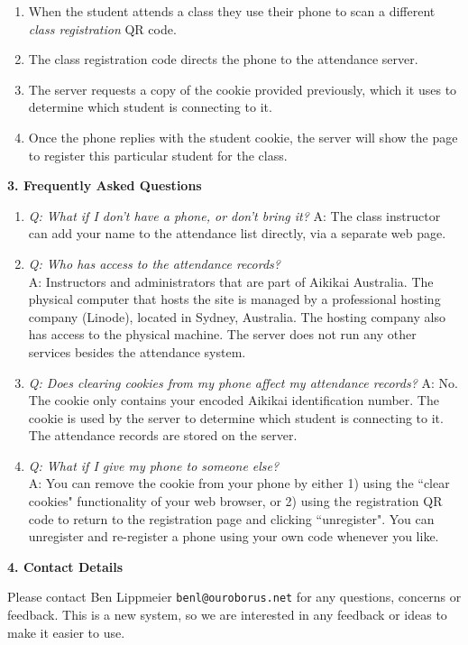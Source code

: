 \begin{minipage}[t]{\dimexpr0.5\linewidth-1em}
\begin{center}
\begin{enumerate}
\item When the student attends a class they use their phone to scan
      a different \emph{class registration} QR code.
\item The class registration code directs the phone to the
      attendance server.
\item The server requests a copy of the cookie provided previously,
      which it uses to determine which student is connecting to it.
\item Once the phone replies with the student cookie,
      the server will show the page to register this particular
      student for the class.
\end{enumerate}
\end{center}


\smallskip
\textbf{3. Frequently Asked Questions}
\begin{enumerate}
\item \emph{Q: What if I don't have a phone, or don't bring it?}
      A: The class instructor can add your name to the attendance list
         directly, via a separate web page.

\item \emph{Q: Who has access to the attendance records?} \\
      A: Instructors and administrators that are part of Aikikai Australia.
         The physical computer that hosts the site is managed by a professional
         hosting company (Linode), located in Sydney, Australia. The hosting company
         also has access to the physical machine. The server does not run any other
         services besides the attendance system.

\item \emph{Q: Does clearing cookies from my phone affect my attendance records?}
      A: No. The cookie only contains your encoded Aikikai identification number.
         The cookie is used by the server to determine which student
         is connecting to it. The attendance records are stored on the server.

\item \emph{Q: What if I give my phone to someone else?} \\
      A: You can remove the cookie from your phone by either 1) using the ``clear cookies"
         functionality of your web browser, or 2) using the registration QR code to return
         to the registration page and clicking ``unregister". You can unregister
         and re-register a phone using your own code whenever you like.
\end{enumerate}


\medskip
\textbf{4. Contact Details}

Please contact Ben Lippmeier \texttt{benl@ouroborus.net} for
any questions, concerns or feedback.
This is a new system, so we are interested in any feedback or ideas to make
it easier to use.
\end{minipage}
